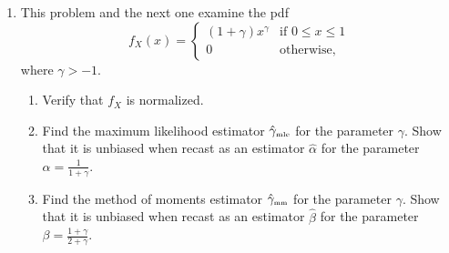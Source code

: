 \documentclass [12pt] {article}
\newcommand{\Var}{{\mbox{Var}}}
\begin{document}
\begin{enumerate}

\item This problem and the next one examine the pdf
\[
f_X(x) = \left\{
\begin{array}{ll}
(1+\gamma)x^\gamma & \mbox{if $0\leq x\leq 1$}\\
0 & \mbox{otherwise,}
\end{array}
\right.
\]
where $\gamma>-1$.
	\begin{enumerate}
	\item Verify that $f_X$ is normalized.
	\item Find the maximum likelihood estimator $\hat{\gamma}_{\mbox{\tiny mle}}$ for the parameter $\gamma$.  Show that it is unbiased when recast as an estimator $\hat{\alpha}$ for the parameter $\alpha = \frac{1}{1+\gamma}$.
	\item Find the method of moments estimator $\hat{\gamma}_{\mbox{\tiny mm}}$ for the parameter $\gamma$.  Show that it is unbiased when recast as an estimator $\hat{\beta}$ for the parameter $\beta = \frac{1+\gamma}{2+\gamma}$.
	\end{enumerate}


\end{enumerate}
\end{document}
